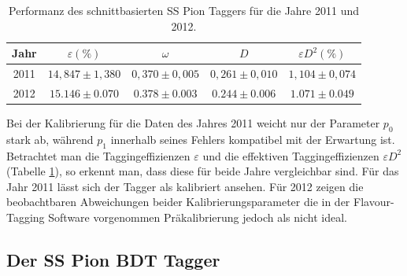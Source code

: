 \begin{table}[htbp]
	\centering
	\caption{Performanz des schnittbasierten SS Pion Taggers für die Jahre \num{2011} und \num{2012}.}
	\label{tab:performance_SSPion}
	\begin{tabular}{ccccc}
	\toprule
       Jahr & $\varepsilon(\%)$ & $\omega$ & $D$ & $\varepsilon D^2(\%)$ \\ 
       \midrule
   2011 & $14{,}847\pm1{,}380$& $0{,}370\pm0{,}005$ & $0{,}261\pm0{,}010$ & $1{,}104\pm0{,}074$\\ 
   2012 & $15{.}146\pm0{.}070$ & $0{.}378\pm0{.}003$ & $0{.}244\pm0{.}006$ & $1{.}071\pm0{.}049$\\ 
   \bottomrule
	\end{tabular}
\end{table}
Bei der Kalibrierung für die Daten des Jahres \num{2011} weicht nur der Parameter $p_0$ stark ab, während $p_1$ innerhalb seines Fehlers kompatibel mit der Erwartung ist. \\
Betrachtet man die Taggingeffizienzen $\varepsilon$ und die effektiven Taggingeffizienzen $\varepsilon D^2$ (Tabelle \ref{tab:performance_SSPion}), so erkennt man, dass diese für beide Jahre vergleichbar sind. Für das Jahr \num{2011} lässt sich der Tagger als kalibriert ansehen. Für \num{2012}  zeigen die beobachtbaren Abweichungen beider Kalibrierungsparameter die in der Flavour-Tagging Software vorgenommen Präkalibrierung jedoch als nicht ideal.  

\subsection{Der SS Pion BDT Tagger}


